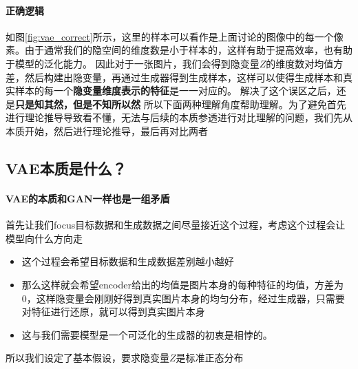 \paragraph{正确逻辑}
如图\ref{fig:vae_correct}所示，这里的样本可以看作是上面讨论的图像中的每一个像素。由于通常我们的隐空间的维度数是小于样本的，这样有助于提高效率，也有助于模型的泛化能力。
因此对于一张图片，我们会得到隐变量$Z$的维度数对均值方差，然后构建出隐变量，再通过生成器得到生成样本，这样可以使得生成样本和真实样本的每一个\textbf{隐变量维度表示的特征}是一一对应的。
解决了这个误区之后，还是\textbf{只是知其然，但是不知所以然} \newline
所以下面两种理解角度帮助理解。为了避免首先进行理论推导导致看不懂，无法与后续的本质参透进行对比理解的问题，我们先从本质开始，然后进行理论推导，最后再对比两者

\subsection{VAE本质是什么？}
\label{sec:vae_essence}
\paragraph{VAE的本质和GAN一样也是一组矛盾}
首先让我们focus目标数据和生成数据之间尽量接近这个过程，考虑这个过程会让模型向什么方向走
\begin{itemize}
    \item 这个过程会希望目标数据和生成数据差别越小越好
    \item 那么这样就会希望encoder给出的均值是图片本身的每种特征的均值，方差为0，这样隐变量会刚刚好得到真实图片本身的均匀分布，经过生成器，只需要对特征进行还原，就可以得到真实图片本身
    \item 这与我们需要模型是一个可泛化的生成器的初衷是相悖的。
\end{itemize}
所以我们设定了基本假设，要求隐变量$Z$是标准正态分布
